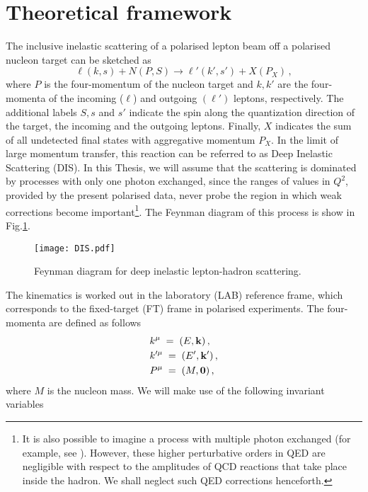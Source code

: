 \section{Theoretical framework}
The inclusive inelastic scattering of a polarised lepton beam off a polarised nucleon target can be sketched as
\begin{equation}
    \ell(k,s) + N(P, S) \longrightarrow \ell'(k',s') + X(P_X) \,,
    \label{eq:DIS}
\end{equation}
where $P$ is the four-momentum of the nucleon target and $k,k'$ are the four-momenta of the incoming ($\ell$) and outgoing $(\ell')$ leptons, respectively. The additional labels $S,s$ and $s'$ indicate the spin along the quantization direction of the target, the incoming and the outgoing leptons. Finally, $X$ indicates the sum of all undetected final states with aggregative momentum $P_X$. In the limit of large momentum transfer, this reaction can be referred to as Deep Inelastic Scattering (DIS). In this Thesis, we will assume that the scattering is dominated by processes with only one photon exchanged, since the ranges of values in $Q^2$, provided by the present polarised data, never probe the region in which weak corrections become important\footnote{It is also possible to imagine a process with multiple photon exchanged (for example, see \cite{leader_predazzi_1996}). However, these higher perturbative orders in QED are negligible with respect to the amplitudes of QCD reactions that take place inside the hadron. We shall neglect such QED corrections henceforth.}. The Feynman diagram of this process is show in Fig.\ref{fig:DIS_Feynamn}.
\begin{figure}[h]
  \centering
  \texttt{[image: DIS.pdf]} 
  \caption{Feynman diagram for deep inelastic lepton-hadron scattering.}
  \label{fig:DIS_Feynamn}
\end{figure}
The kinematics is worked out in the laboratory (LAB) reference frame, which corresponds to the fixed-target (FT) frame in polarised experiments. The four-momenta are defined as follows
\begin{equation}
    \begin{split}
        &k^{\mu} \;=\; \left(E, \vb{k} \right), \\
        &k'^{\mu} \;=\; \left(E', \vb{k'} \right), \\
        &P^{\mu} \;=\; \left(M, \vb{0} \right),
    \end{split}
\end{equation}
where $M$ is the nucleon mass. We will make use of the following invariant variables
